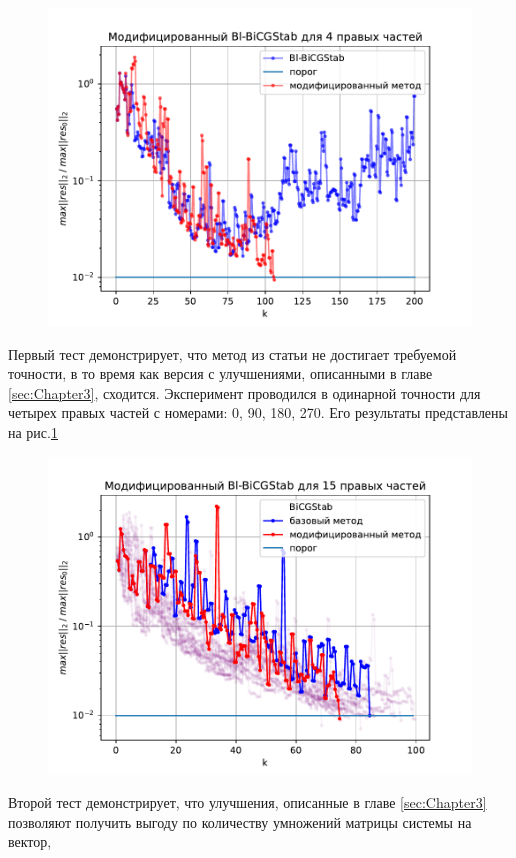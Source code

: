 \begin{figure}[H]
    \centering
    \includegraphics[width=0.7\linewidth]{images/4.pdf}
    \caption{}
    \label{fig:4}
\end{figure} 
\par Первый тест демонстрирует, что метод из статьи \cite{elGuennouni2003} не достигает требуемой точности, в то время как 
версия с улучшениями, описанными в главе \ref{sec:Chapter3}, сходится. 
Эксперимент проводился в одинарной точности для четырех правых частей с номерами: 0, 90, 180, 270. Его результаты представлены
на рис.\ref{fig:4}
\begin{figure}[H]
    \centering
    \includegraphics[width=0.7\linewidth]{images/acceleration_15_rhs.pdf}
    \caption{}
    \label{fig:acceleration_15}
\end{figure}
\par Второй тест демонстрирует, что улучшения, описанные в главе \ref{sec:Chapter3} позволяют получить выгоду по количеству умножений матрицы системы на вектор,
